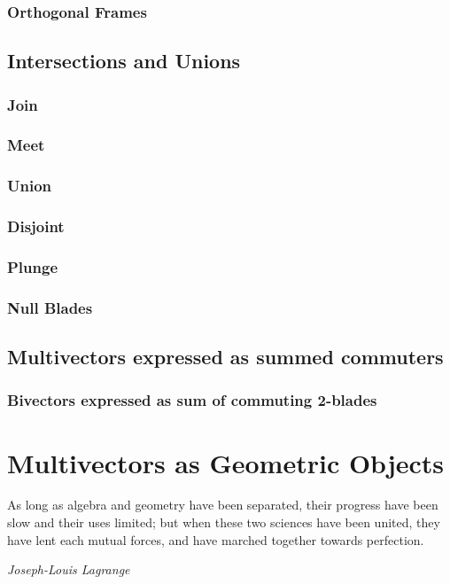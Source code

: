 \documentclass[a4paper]{book}
\numberwithin{equation}{chapter}
\begin{document}
    \subsection{Orthogonal Frames}
    
    
    \section{Intersections and Unions}
    \subsection{Join}
    \subsection{Meet}
    \subsection{Union}
    \subsection{Disjoint}
    \subsection{Plunge}
    \subsection{Null Blades}
    
    \section{Multivectors expressed as summed commuters}
    \subsection{ Bivectors expressed as sum of commuting 2-blades}

    
    
    \chapter{Multivectors as Geometric Objects}

\epigraph{As long as algebra and geometry have been separated, their progress have been slow and their uses limited; but when these two sciences have been united, they have lent each mutual forces, and have marched together towards perfection.}{\textit{Joseph-Louis Lagrange }}
\end{document}
